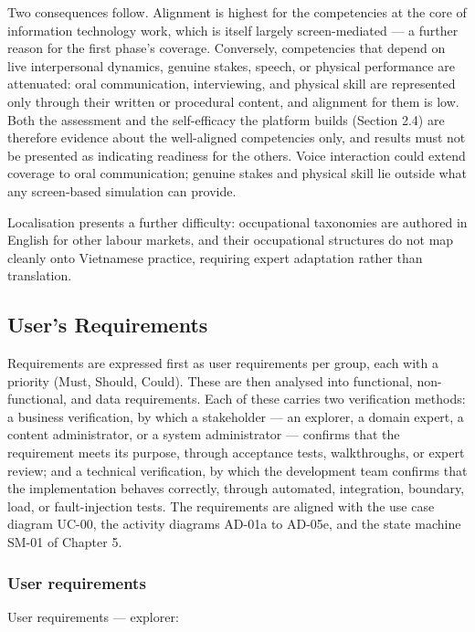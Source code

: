 Two consequences follow. Alignment is highest for the competencies at the core of information technology work, which is itself largely screen-mediated --- a further reason for the first phase's coverage. Conversely, competencies that depend on live interpersonal dynamics, genuine stakes, speech, or physical performance are attenuated: oral communication, interviewing, and physical skill are represented only through their written or procedural content, and alignment for them is low. Both the assessment and the self-efficacy the platform builds (Section 2.4) are therefore evidence about the well-aligned competencies only, and results must not be presented as indicating readiness for the others. Voice interaction could extend coverage to oral communication; genuine stakes and physical skill lie outside what any screen-based simulation can provide.

Localisation presents a further difficulty: occupational taxonomies are authored in English for other labour markets, and their occupational structures do not map cleanly onto Vietnamese practice, requiring expert adaptation rather than translation.

\subsection{User's Requirements}

Requirements are expressed first as user requirements per group, each with a priority (Must, Should, Could). These are then analysed into functional, non-functional, and data requirements. Each of these carries two verification methods: a business verification, by which a stakeholder --- an explorer, a domain expert, a content administrator, or a system administrator --- confirms that the requirement meets its purpose, through acceptance tests, walkthroughs, or expert review; and a technical verification, by which the development team confirms that the implementation behaves correctly, through automated, integration, boundary, load, or fault-injection tests. The requirements are aligned with the use case diagram UC-00, the activity diagrams AD-01a to AD-05e, and the state machine SM-01 of Chapter 5.

\subsubsection{User requirements}

User requirements --- explorer:

